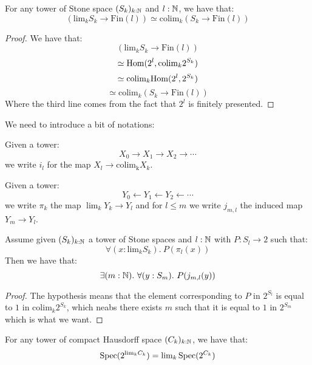 \begin{lemma}\label{factorisation-stone-finite}
For any tower of Stone space $(S_k)_{k:\mathbb{N}}$ and $l:\mathbb{N}$, we have that:
\[\left(\mathrm{lim}_kS_k\to \mathrm{Fin}(l)\right) \simeq \mathrm{colim}_k (S_k\to \mathrm{Fin}(l))\]
\end{lemma}

\begin{proof}
We have that:
\[\left(\mathrm{lim}_kS_k\to \mathrm{Fin}(l)\right) \]
\[\simeq \mathrm{Hom}(2^l, \mathrm{colim}_k 2^{S_k})\]
\[\simeq \mathrm{colim}_k \mathrm{Hom}(2^l, 2^{S_k}) \]
\[\simeq \mathrm{colim}_k (S_k\to \mathrm{Fin}(l))\]
Where the third line comes from the fact that $2^l$ is finitely presented.
\end{proof}

We need to introduce a bit of notations:

Given a tower: 
\[X_0 \to X_1\to X_2\to \cdots \]
we write $i_l$ for the map $X_l\to\mathrm{colim_k}X_k$.

Given a tower: 
\[Y_0 \leftarrow Y_1\leftarrow Y_2 \leftarrow \cdots\]
we write $\pi_k$ the map $\lim_k Y_k\to Y_l$ and for $l\leq m$ we write $j_{m,l}$ the induced map $Y_m\to Y_l$.

\begin{lemma}\label{sequential-limits-decidable}
Assume given $(S_k)_{k:\mathbb{N}}$ a tower of Stone spaces and $l:\mathbb{N}$ with $P:S_l\to 2$ such that:
\[\forall (x:\mathrm{lim}_kS_k).\ P(\pi_l(x))\]
Then we have that:
\[\exists(m:\N).\ \forall(y:S_m).\ P(j_{m,l}(y))\]
\end{lemma}

\begin{proof}
The hypothesis means that the element corresponding to $P$ in $2^{S_l}$ is equal to $1$ in $\mathrm{colim}_k2^{S_k}$, which neabs there exists $m$ such that it is equal to $1$ in $2^{S_m}$ which is what we want.
\end{proof}

\begin{lemma}\label{stonification-sequential-limits}
For any tower of compact Hausdorff space $(C_k)_{k:\mathbb{N}}$, we have that:
\[\operatorname{Spec}(2^{\mathrm{lim}_k C_k}) = \mathrm{lim}_k\operatorname{Spec}(2^{C_k})\]
\end{lemma}

